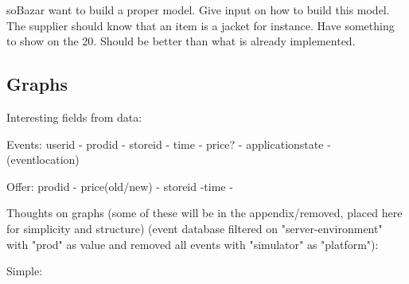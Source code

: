 soBazar want to build a proper model.  Give input on how to build this model.
The supplier should know that an item is a jacket for instance.  Have something
to show on the 20. Should be better than what is already implemented.

\subsection{Graphs}

Interesting fields from data:

    Events: userid - prodid - storeid - time - price? - applicationstate - (eventlocation)

    Offer: prodid - price(old/new) - storeid -time -

Thoughts on graphs (some of these will be in the appendix/removed, placed here
for simplicity and structure) (event database filtered on "server-environment"
with "prod" as value and removed all events with "simulator" as "platform"):



    Simple:

